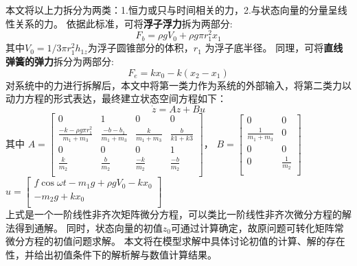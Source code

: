 \documentclass[withoutpreface,bwprint]{cumcmthesis} %
\begin{document}
    本文将以上力拆分为两类：1.恒力或只与时间相关的力，2.与状态向量的分量呈线性关系的力。
    依据此标准，可将\textbf{浮子浮力}拆为两部分:
    \begin{equation}
        F_b = \rho g V_0 + \rho g \pi r_1^2 x_1
        \label{eq:split_b}
    \end{equation} 其中$V_0 = 1/3 \pi r_1^2 h_{1z}$为浮子圆锥部分的体积，$r_1$ 为浮子底半径。
    同理，可将\textbf{直线弹簧的弹力}拆分为两部分: 
    \begin{equation}
        F_e = k x_0 - k(x_2 - x_1)
        \label{eq:split_e}
    \end{equation} 对系统中的力进行拆解后，本文中将第一类力作为系统的外部输入，将第二类力以动力方程的形式表达，最终建立状态空间方程如下：
    \begin{equation}
        \dot{z}= Az + Bu
        \label{eq:space}
    \end{equation}
    其中 $
        A = \left [
        \begin{array}{cccc}
            0 & 1 & 0 & 0 \\
            \frac{-k -\rho g \pi r_1^2}{m_1 + m_3} & \frac{- b - b_1}{m_1 + m_3} & \frac{k}{m_1 + m_3} & \frac{b}{k1 + k3}\\
            0 & 0 & 0 & 1 \\
            \frac{k}{m_2}& \frac{b}{m_2} & \frac{-k}{m_2} & \frac{-b}{m_2}\\
        \end{array} \right ]
        $，
        $
        B = \left [
        \begin{array}{cc}
        0&0\\
        \frac{1}{m_1 + m_3}&0\\
        0&0\\
        0&\frac{1}{m_2}\\
        \end{array} \right ]
        $ \\
        $
        u = \left [
        \begin{array}{c}
        f\cos \omega t - m_1 g + \rho g V_0 - k x_0\\
        -m_2 g + k x_0 \\
        \end{array} \right ]
        $ \\
    上式是一个一阶线性非齐次矩阵微分方程，可以类比一阶线性非齐次微分方程的解法得到通解。
    同时，状态向量的初值$ z_0 $可通过计算确定，故原问题可转化矩阵常微分方程的初值问题求解。
    本文将在模型求解中具体讨论初值的计算、解的存在性，并给出初值条件下的解析解与数值计算结果。
\end{document}
